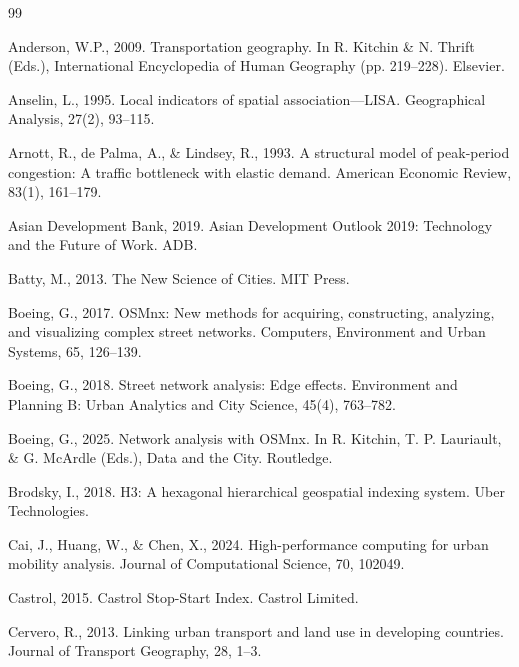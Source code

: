 \documentclass[12pt,a4paper]{article}
\begin{document}
\begin{thebibliography}{99}

\item Anderson, W.P., 2009. Transportation geography. In R. Kitchin \& N. Thrift (Eds.), International Encyclopedia of Human Geography (pp. 219--228). Elsevier.

\item Anselin, L., 1995. Local indicators of spatial association---LISA. Geographical Analysis, 27(2), 93--115.

\item Arnott, R., de Palma, A., \& Lindsey, R., 1993. A structural model of peak-period congestion: A traffic bottleneck with elastic demand. American Economic Review, 83(1), 161--179.

\item Asian Development Bank, 2019. Asian Development Outlook 2019: Technology and the Future of Work. ADB.

\item Batty, M., 2013. The New Science of Cities. MIT Press.

\item Boeing, G., 2017. OSMnx: New methods for acquiring, constructing, analyzing, and visualizing complex street networks. Computers, Environment and Urban Systems, 65, 126--139.

\item Boeing, G., 2018. Street network analysis: Edge effects. Environment and Planning B: Urban Analytics and City Science, 45(4), 763--782.

\item Boeing, G., 2025. Network analysis with OSMnx. In R. Kitchin, T. P. Lauriault, \& G. McArdle (Eds.), Data and the City. Routledge.

\item Brodsky, I., 2018. H3: A hexagonal hierarchical geospatial indexing system. Uber Technologies.

\item Cai, J., Huang, W., \& Chen, X., 2024. High-performance computing for urban mobility analysis. Journal of Computational Science, 70, 102049.

\item Castrol, 2015. Castrol Stop-Start Index. Castrol Limited.

\item Cervero, R., 2013. Linking urban transport and land use in developing countries. Journal of Transport Geography, 28, 1--3.


\end{thebibliography}
\end{document}
